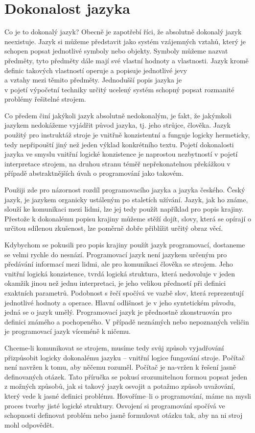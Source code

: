 \documentclass[10pt,twoside=true,open=right,cleardoublepage=empty,chapterprefix=true]{scrbook}
\newcommand{\oddil}[1]{\section{#1}\index{#1}\label{#1}}
\begin{document}
\oddil{Dokonalost jazyka}

Co je to dokonalý jazyk? Obecně je zapotřebí říci, že absolutně dokonalý jazyk neexistuje. Jazyk si můžeme představit jako systém vzájemných vztahů, který je schopen popsat jednotlivé symboly nebo objekty. Symboly můžeme nazvat předměty, tyto předměty dále mají své vlastní hodnoty a vlastnosti. Jazyk kromě definic takových vlastností operuje a popisuje jednotlivé jevy \\a vztahy mezi těmito předměty. Jednodušší popis jazyka je \\v pojetí výpočetní techniky určitý ucelený systém schopný popsat rozmanité problémy řešitelné strojem.

Co předem činí jakýkoli jazyk absolutně nedokonalým, je fakt, že jakýmkoli jazykem nedokážeme vyjádřit původ jazyka, tj. jeho strůjce, člověka. Jazyk použitý pro instruktáž stroje je vnitřně konzistentní a funguje logicky hermeticky, tedy nepřipouští jiný než jeden výklad konkrétního textu. Pojetí dokonalosti jazyka ve smyslu vnitřní logické konzistence je naprostou nezbytností v pojetí interpretace strojem, na druhou stranu téměř nepřekonatelnou překážkou v případě abstraktnějších úvah o programování jako takovém.

Použiji zde pro názornost rozdíl programovacího jazyka a jazyka českého. Český jazyk, je jazykem organicky ustáleným po staletích užívání. Jazyk, jak ho známe, slouží ke komunikaci mezi lidmi, lze jej tedy použít například pro popis krajiny. Přestože k dokonalému popisu krajiny můžeme stěží dojít, slovy, která se opírají o určitou sdílenou zkušenost, lze poměrně dobře přiblížit určitý obraz věcí.

Kdybychom se pokusili pro popis krajiny použít jazyk programovací, dostaneme se velmi rychle do nesnází. Programovací jazyk není jazykem určeným pro předávání informací mezi lidmi, ale pro komunikaci člověka se strojem. Jeho vnitřní logická konzistence, tvrdá logická struktura, která nedovoluje v jeden okamžik jinou než jednu interpretaci, je jeho velikou předností při definici exaktních parametrů. Podobnost s řečí spočívá ve vazbě slov, která reprezentují jednotlivé hodnoty a operace. Hlavní odlišnost je v jeho syntetickém původu, jedná se o jazyk umělý. Programovací jazyk je přednostně zkonstruován pro definici známého a pochopeného. V případě neznámých nebo nepoznaných veličin je programovací jazyk víceméně k ničemu. 

Chceme-li komunikovat se strojem, musíme tedy svůj způsob vyjadřování přizpůsobit logicky dokonalému jazyku -- vnitřní logice fungování stroje. Počítač není navržen k tomu, aby něčemu rozuměl. Počítač je na-vržen k řešení jasně definovaných otázek. Tato příručka se pokusí srozumitelnou formou popsat jeden z možných způsobů, jak si takový jazyk osvojit a potažmo způsob uvažování, který vede k jasné definici problému. Hovoříme--li o programování, máme na mysli proces tvorby jisté logické struktury. Osvojení si programování spočívá ve schopnosti definovat problém nebo jasně formulovat otázku tak, aby na ni stroj mohl odpovědět.
\end{document}
